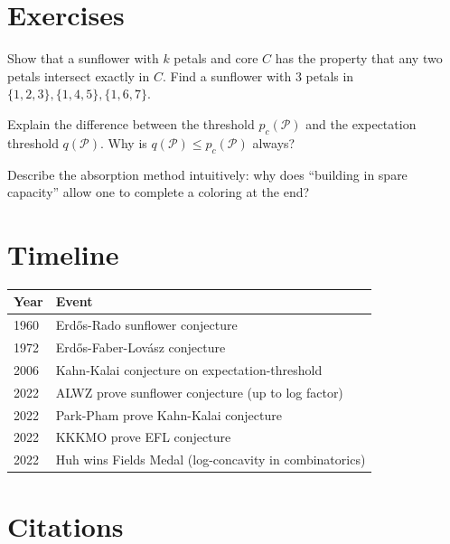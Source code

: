 \section{Exercises}

\begin{exercise}[Basic]
Show that a sunflower with $k$ petals and core $C$ has the property that any two petals intersect exactly in $C$. Find a sunflower with 3 petals in $\{1,2,3\}, \{1,4,5\}, \{1,6,7\}$.
\end{exercise}

\begin{exercise}[Intermediate]
Explain the difference between the threshold $p_c(\mathcal{P})$ and the expectation threshold $q(\mathcal{P})$. Why is $q(\mathcal{P}) \le p_c(\mathcal{P})$ always?
\end{exercise}

\begin{exercise}[Challenge]
Describe the absorption method intuitively: why does ``building in spare capacity'' allow one to complete a coloring at the end?
\end{exercise}

\section{Timeline}

\begin{tabularx}{\linewidth}{lX}
\toprule
\textbf{Year} & \textbf{Event} \\ \midrule
1960 & Erd\H{o}s-Rado sunflower conjecture \\
1972 & Erd\H{o}s-Faber-Lov\'{a}sz conjecture \\
2006 & Kahn-Kalai conjecture on expectation-threshold \\
2022 & ALWZ prove sunflower conjecture (up to log factor) \\
2022 & Park-Pham prove Kahn-Kalai conjecture \\
2022 & KKKMO prove EFL conjecture \\
2022 & Huh wins Fields Medal (log-concavity in combinatorics) \\
\bottomrule
\end{tabularx}

\section{Citations}

